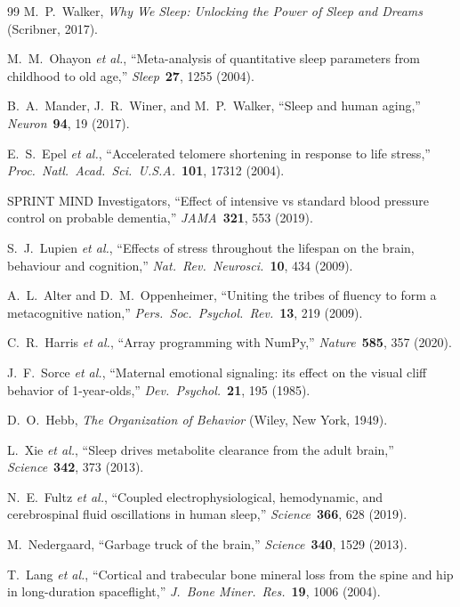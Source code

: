 \documentclass[aps,pre,twocolumn,superscriptaddress,floatfix]{revtex4-2}
\begin{document}
\begin{thebibliography}{99}
M.~P.~Walker,
\emph{Why We Sleep: Unlocking the Power of Sleep and Dreams}
(Scribner, 2017).

M.~M.~Ohayon \emph{et al.},
``Meta-analysis of quantitative sleep parameters from
childhood to old age,''
\emph{Sleep}\ \textbf{27}, 1255 (2004).

B.~A.~Mander, J.~R.~Winer, and M.~P.~Walker,
``Sleep and human aging,''
\emph{Neuron}\ \textbf{94}, 19 (2017).

E.~S.~Epel \emph{et al.},
``Accelerated telomere shortening in response to life stress,''
\emph{Proc.\ Natl.\ Acad.\ Sci.\ U.S.A.}\ \textbf{101},
17312 (2004).

SPRINT MIND Investigators,
``Effect of intensive vs standard blood pressure control on
probable dementia,''
\emph{JAMA}\ \textbf{321}, 553 (2019).

S.~J.~Lupien \emph{et al.},
``Effects of stress throughout the lifespan on the brain,
behaviour and cognition,''
\emph{Nat.\ Rev.\ Neurosci.}\ \textbf{10}, 434 (2009).

A.~L.~Alter and D.~M.~Oppenheimer,
``Uniting the tribes of fluency to form a metacognitive nation,''
\emph{Pers.\ Soc.\ Psychol.\ Rev.}\ \textbf{13}, 219 (2009).

C.~R.~Harris \emph{et al.},
``Array programming with NumPy,''
\emph{Nature}\ \textbf{585}, 357 (2020).

J.~F.~Sorce \emph{et al.},
``Maternal emotional signaling: its effect on the
visual cliff behavior of 1-year-olds,''
\emph{Dev.\ Psychol.}\ \textbf{21}, 195 (1985).

D.~O.~Hebb,
\emph{The Organization of Behavior}
(Wiley, New York, 1949).

L.~Xie \emph{et al.},
``Sleep drives metabolite clearance from the adult brain,''
\emph{Science}\ \textbf{342}, 373 (2013).

N.~E.~Fultz \emph{et al.},
``Coupled electrophysiological, hemodynamic, and
cerebrospinal fluid oscillations in human sleep,''
\emph{Science}\ \textbf{366}, 628 (2019).

M.~Nedergaard,
``Garbage truck of the brain,''
\emph{Science}\ \textbf{340}, 1529 (2013).

T.~Lang \emph{et al.},
``Cortical and trabecular bone mineral loss from
the spine and hip in long-duration spaceflight,''
\emph{J.\ Bone Miner.\ Res.}\ \textbf{19}, 1006 (2004).


\end{thebibliography}
\end{document}
